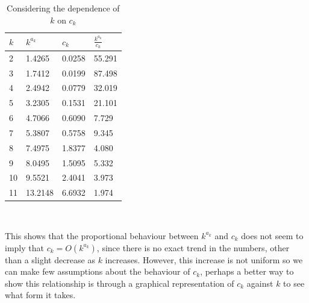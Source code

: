 \documentclass[12pt]{report}
\begin{document}
\begin{table}
\caption{Considering the dependence of $k$ on $c_{k}$} \label{uniform_dependentk}
\begin{center}
\begin{tabular}{| l | l l l |} 
\toprule
$k$ &  $k^{a_{k}}$ & $c_{k}$ & $\frac{k^{a_{k}}}{c_{k}}$ \\
\midrule[1pt]
2     &  1.4265    & 0.0258    &    55.291   \\
3     &  1.7412    & 0.0199    &    87.498   \\
4     &  2.4942    & 0.0779    &    32.019   \\
5     &  3.2305    & 0.1531    &    21.101   \\
6     &  4.7066    & 0.6090    &     7.729   \\
7     &  5.3807    & 0.5758    &     9.345   \\
8     &  7.4975    & 1.8377    &     4.080   \\
9     &  8.0495    & 1.5095    &     5.332   \\
10    &  9.5521    & 2.4041    &     3.973   \\
11    & 13.2148    & 6.6932    &     1.974   \\
\hline
\end{tabular}
\\[10pt]
\end{center}
\end{table}

This shows that the proportional behaviour between $k^{a_{k}}$ and $c_{k}$ does not seem to imply that $c_{k} = O(k^{a_{k}})$, since there is no exact trend in the numbers, other than a slight decrease as $k$ increases. However, this increase is not uniform so we can make few assumptions about the behaviour of $c_{k}$, perhaps a better way to show this relationship is through a graphical representation of $c_{k}$ against $k$ to see what form it takes.
\end{document}
